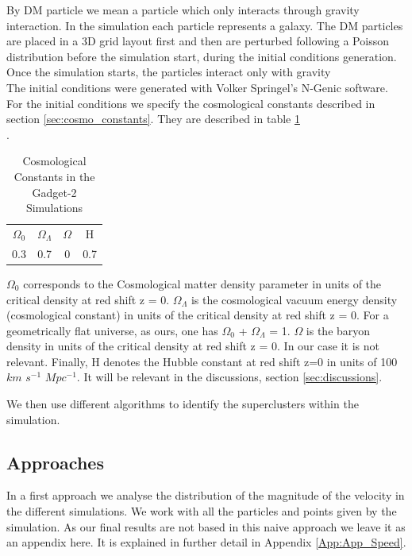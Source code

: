 \documentclass[12pt]{article}
\begin{document}
By DM particle we mean a particle which only
 interacts through gravity
interaction. In the simulation each particle
 represents a galaxy. The DM particles are
placed in a 3D grid layout first and then are
 perturbed following a Poisson distribution
before the simulation start, during the initial
 conditions generation. Once the simulation starts, the particles interact only with gravity\\

The initial conditions were generated with Volker
 Springel's N-Genic software. For the initial
  conditions we specify the cosmological constants
   described in section \ref{sec:cosmo_constants}. They
    are described in table \ref{tab:consts}\\.
   
  
 \begin{table}[ht]
    \centering
    \begin{tabular}{|c|c|c|c|}
        $\Omega_0$ & $\Omega_{\Lambda}$ & $\Omega$ & H \\
        0.3 &  0.7 & 0 & 0.7 \\
    \end{tabular}
    \caption{Cosmological Constants in the Gadget-2 Simulations}
    \label{tab:consts}
\end{table}
\FloatBarrier
$\Omega_0$  corresponds to the Cosmological matter
 density parameter in units of the critical density at
red shift z = 0. $\Omega_{\Lambda}$ is the cosmological
 vacuum energy density (cosmological constant) in
  units of the critical density at red shift z = 0. 
For a geometrically flat universe, as ours, one has
 $\Omega_0$ + $\Omega_{\Lambda}$ = 1.
 $\Omega$ is the baryon density in units
  of the critical density at red shift z = 0. In our
   case it
   is not relevant. Finally, H denotes the Hubble
    constant at red shift z=0 in  units of 100 
    $km$ $s^{-1}$
     $Mpc^{-1}$. It will be relevant in the
      discussions, section \ref{sec:discussions}.

We then use different algorithms to identify the
 superclusters within the simulation.\\

\subsection{Approaches} \label{sec:approaches}
\begin{par}
In a first approach we analyse the distribution of
 the magnitude of the velocity in the different
  simulations. We work with all the particles and
   points given by the simulation. As our final
    results are not based in this naive approach
     we leave it as an appendix here. It is
      explained in further detail in Appendix
       \ref{App:App_Speed}.\\
\end{par}
\end{document}
